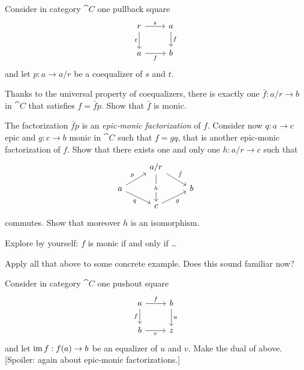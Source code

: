 
\begin{exercise}
Consider in category \(\cat C\) one pullback square
\[\begin{tikzcd}
r \ar["s", r] \ar["t", d, swap] & a \ar["f", d] \\
a \ar["f", r, swap] & b
\end{tikzcd}\]
and let \(p : a \to {a}{/}{r}\) be a coequalizer of \(s\) and \(t\).
\begin{tcbenum}
\item Thanks to the universal property of coequalizers, there is exactly one \(\bar f : {a}{/}{r} \to b\) in \(\cat C\) that satisfies \(f = \bar f p\). Show that \(\bar f\) is monic.
\item The factorization \(\bar f p\) is an {\em epic-monic factorization} of \(f\). Consider now \(q : a \to c\) epic and \(g : c \to b\) monic in \(\cat C\) such that \(f = gq\), that is another epic-monic factorization of \(f\). Show that there exists one and only one \(h : {a}{/}{r} \to c\) such that
\[\begin{tikzcd}[row sep=small]
& {a}{/}{r} \ar["h" description, dd] \ar["{\bar f}", dr] & \\
a \ar["p", ur] \ar["q", dr, swap] & & b \\
& c \ar["g", ur, swap]
\end{tikzcd}\]
commutes. Show that moreover \(h\) is an isomorphism.
\item Explore by yourself: \(f\) is monic if and only if \dots{}
\item Apply all that above to some concrete example. Does this sound familiar now?
\end{tcbenum}
Consider in category \(\cat C\) one pushout square
\[\begin{tikzcd}
a \ar["f", r] \ar["f", d, swap] & b \ar["u", d] \\
b \ar["v", r, swap] & z 
\end{tikzcd}\]
and let \(\operatorname{im} f : f(a) \to b\) be an equalizer of \(u\) and \(v\). Make the dual of above. [Spoiler: again about epic-monic factorizations.]
\end{exercise}

\begin{exercise}
\YetToBeTeXed
\end{exercise}
